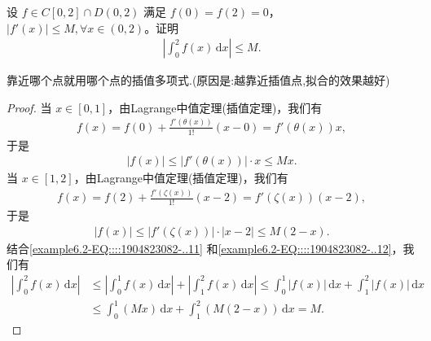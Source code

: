 \documentclass[../../main.tex]{subfiles}
\begin{document}
\begin{example}
设 $f \in C[0,2] \cap D(0,2)$ 满足 $f(0) = f(2) = 0$，$|f'(x)| \leqslant  M, \forall x \in (0,2)$。证明
\begin{align*}
\left| \int_{0}^{2} f(x) \, \mathrm{d}x \right| \leqslant  M.
\end{align*}
\end{example}
\begin{note}
靠近哪个点就用哪个点的插值多项式.(原因是:越靠近插值点,拟合的效果越好)
\end{note}
\begin{proof}
当 $x \in [0,1]$，由Lagrange中值定理(插值定理)，我们有
\begin{align*}
f(x) = f(0) + \frac{f'(\theta(x))}{1!} (x - 0) = f'(\theta(x)) x,
\end{align*}
于是
\begin{align}
|f(x)| \leqslant  |f'(\theta(x))| \cdot x \leqslant  Mx.\label{example6.2-EQ::::1904823082-..11}
\end{align}
当 $x \in [1,2]$，由Lagrange中值定理(插值定理)，我们有
\begin{align*}
f(x) = f(2) + \frac{f'(\zeta(x))}{1!} (x - 2) = f'(\zeta(x)) (x - 2),
\end{align*}
于是
\begin{align}
|f(x)| \leqslant  |f'(\zeta(x))| \cdot |x - 2| \leqslant  M(2 - x).\label{example6.2-EQ::::1904823082-..12}
\end{align}
结合\eqref{example6.2-EQ::::1904823082-..11} 和\eqref{example6.2-EQ::::1904823082-..12}，我们有
\begin{align*}
\left| \int_{0}^{2} f(x) \, \mathrm{d}x \right| &\leqslant  \left| \int_{0}^{1} f(x) \, \mathrm{d}x \right| + \left| \int_{1}^{2} f(x) \, \mathrm{d}x \right| 
\leqslant  \int_{0}^{1} |f(x)| \, \mathrm{d}x + \int_{1}^{2} |f(x)| \, \mathrm{d}x \\
&\leqslant  \int_{0}^{1} (Mx) \, \mathrm{d}x + \int_{1}^{2} (M(2 - x)) \, \mathrm{d}x 
= M.
\end{align*}

\end{proof}
\end{document}
